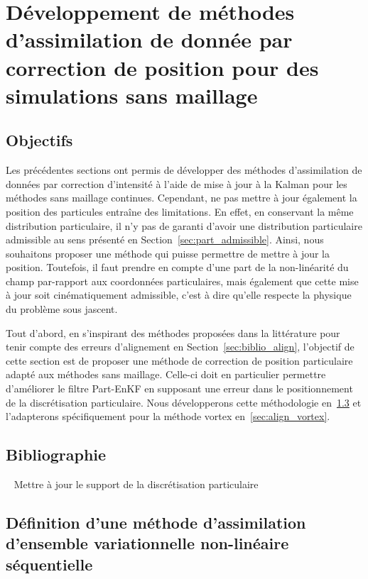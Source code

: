 
\chapter{Développement de méthodes d'assimilation de donnée par correction de position pour des simulations sans maillage}

\section{Objectifs}

Les précédentes sections ont permis de développer des méthodes d'assimilation de données par correction d'intensité à l'aide de mise à jour à la Kalman pour les méthodes sans maillage continues. Cependant, ne pas mettre à jour également la position des particules entraîne des limitations. En effet, en conservant la même distribution particulaire, il n'y pas de garanti d'avoir une distribution particulaire admissible au sens présenté en Section~\ref{sec:part_admissible}.
Ainsi, nous souhaitons proposer une méthode qui puisse permettre de mettre à jour la position. Toutefois, il faut prendre en compte d'une part de la non-linéarité du champ par-rapport aux coordonnées particulaires, mais également que cette mise à jour soit cinématiquement admissible, c'est à dire qu'elle respecte la physique du problème sous jascent.

Tout d'abord, en s'inspirant des méthodes proposées dans la littérature pour tenir compte des erreurs d'alignement en Section~\ref{sec:biblio_align}, l'objectif de cette section est de proposer une méthode de correction de position particulaire adapté aux méthodes sans maillage. Celle-ci doit en particulier permettre d'améliorer le filtre Part-EnKF en supposant une erreur dans le positionnement de la discrétisation particulaire. Nous développerons cette méthodologie en~\ref{} et l'adapterons spécifiquement pour la méthode vortex en~\ref{sec:align_vortex}.

\section{Bibliographie}~\label{sec:biblio_align}
Mettre à jour le support de la discrétisation particulaire

\section{Définition d'une méthode d'assimilation d'ensemble variationnelle non-linéaire séquentielle}~\label{sec:align_filter}

